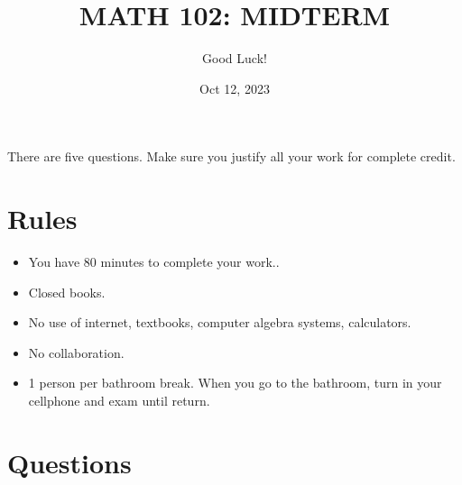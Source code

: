 \documentclass[12pt]{amsart}
\title{ MATH 102: MIDTERM }
\author{Good Luck!}
\date{Oct 12, 2023}
\begin{document}
\maketitle


There are five questions. Make sure you justify all your work for complete credit.

\section*{Rules}

\begin{itemize}[leftmargin=*]
    \item You have 80  minutes to complete your work..
    \item Closed books.
    \item No use of internet, textbooks, computer algebra systems, calculators. 
    \item No collaboration.
    \item 1 person per bathroom break. When you go to the bathroom, turn in your cellphone and exam until return.
\end{itemize}

\newpage

\section*{Questions}
\end{document}
